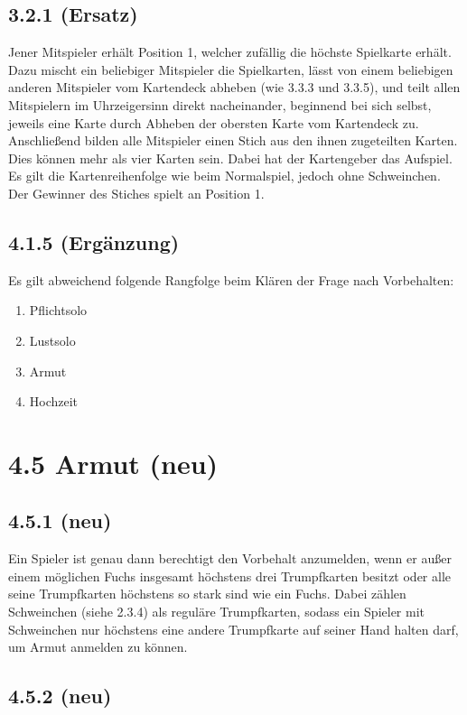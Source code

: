 \subsection*{3.2.1 (Ersatz)}

Jener Mitspieler erhält Position 1, welcher zufällig die höchste
Spielkarte erhält. Dazu mischt ein beliebiger Mitspieler die
Spielkarten, lässt von einem beliebigen anderen Mitspieler vom
Kartendeck abheben (wie 3.3.3 und 3.3.5), und teilt allen Mitspielern im
Uhrzeigersinn direkt nacheinander, beginnend bei sich selbst, jeweils
eine Karte durch Abheben der obersten Karte vom Kartendeck zu.
Anschließend bilden alle Mitspieler einen Stich aus den ihnen
zugeteilten Karten. Dies können mehr als vier Karten sein. Dabei hat
der Kartengeber das Aufspiel. Es gilt die Kartenreihenfolge wie beim
Normalspiel, jedoch ohne Schweinchen. Der Gewinner des Stiches spielt an
Position 1.

\subsection*{4.1.5 (Ergänzung)}

Es gilt abweichend folgende Rangfolge beim Klären der Frage nach
Vorbehalten:

\begin{enumerate}
	\item Pflichtsolo
	\item Lustsolo
	\item Armut
	\item Hochzeit
\end{enumerate}

\section*{4.5 Armut (neu)}

\subsection*{4.5.1 (neu)}
 Ein Spieler ist genau dann berechtigt den Vorbehalt 
anzumelden, wenn er außer einem möglichen Fuchs insgesamt höchstens
drei Trumpfkarten besitzt oder alle seine Trumpfkarten höchstens so
stark sind wie ein Fuchs. Dabei zählen Schweinchen (siehe 2.3.4) als
reguläre Trumpfkarten, sodass ein Spieler mit Schweinchen nur
höchstens eine andere Trumpfkarte auf seiner Hand halten darf, um Armut
anmelden zu können.

\subsection*{4.5.2 (neu)}

